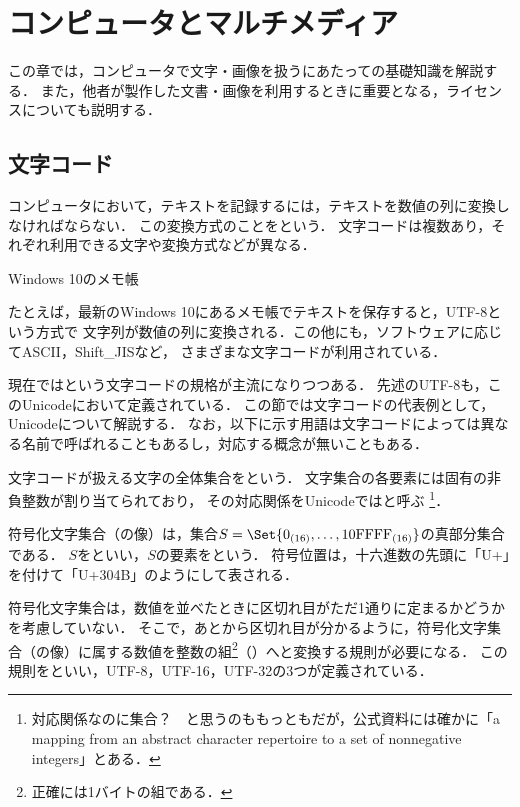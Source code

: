 \documentclass[../../index]{subfiles}
\begin{document}
\chapter{コンピュータとマルチメディア}
この章では，コンピュータで文字・画像を扱うにあたっての基礎知識を解説する．
また，他者が製作した文書・画像を利用するときに重要となる，ライセンスについても説明する．

\section{文字コード}
コンピュータにおいて，テキストを記録するには，テキストを数値の列に変換しなければならない．
この変換方式のことをという．
文字コードは複数あり，それぞれ利用できる文字や変換方式などが異なる．

\begin{floatingfigure}{\smallfiguresize}
  \centering
  \caption{Windows 10のメモ帳}
\end{floatingfigure}

たとえば，最新のWindows 10にあるメモ帳でテキストを保存すると，UTF-8という方式で
文字列が数値の列に変換される．この他にも，ソフトウェアに応じてASCII，Shift\_JISなど，
さまざまな文字コードが利用されている．

現在ではという文字コードの規格が主流になりつつある．
先述のUTF-8も，このUnicodeにおいて定義されている．
この節では文字コードの代表例として，Unicodeについて解説する．
なお，以下に示す用語は文字コードによっては異なる名前で呼ばれることもあるし，対応する概念が無いこともある．

文字コードが扱える文字の全体集合をという．
文字集合の各要素には固有の非負整数が割り当てられており，
その対応関係をUnicodeではと呼ぶ
\footnote{対応関係なのに集合？　と思うのももっともだが，公式資料には確かに「a mapping from an abstract character repertoire to a set of nonnegative integers」\cite{Whistler2008}とある．}．

符号化文字集合（の像）は，集合\(S=\Set{0_{(16)},\dots,\literal{10FFFF}_{(16)}}\)の真部分集合である．
\(S\)をといい，\(S\)の要素をという．
符号位置は，十六進数の先頭に「U+」を付けて「U+304B」のようにして表される．

符号化文字集合は，数値を並べたときに区切れ目がただ1通りに定まるかどうかを考慮していない．
そこで，あとから区切れ目が分かるように，符号化文字集合（の像）に属する数値を整数の組\footnote{正確には1バイトの組である．}（）へと変換する規則が必要になる．
この規則をといい，UTF-8，UTF-16，UTF-32の3つが定義されている．
\end{document}

